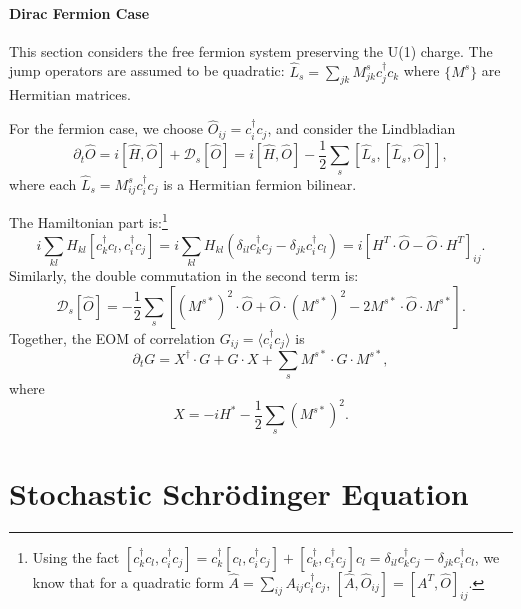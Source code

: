 \documentclass{SciPost}
\begin{document}
\paragraph{Dirac Fermion Case}

This section considers the free fermion system preserving the U(1) charge. The jump operators are assumed to be quadratic: $\hat L_s = \sum_{jk} M^s_{jk} c_j^\dagger c_k$ where $\{M^s\}$ are Hermitian matrices.

For the fermion case, we choose $\hat O_{ij} = c_i^\dagger c_j$, and consider the Lindbladian
\begin{equation}
	\partial_t \hat O = i[\hat H, \hat O] + \mathcal D_s[\hat O]
	= i[\hat H, \hat O] - \frac{1}{2} \sum_s [\hat L_s,[\hat L_s,\hat O]],
\end{equation}
where each $\hat L_s = M^s_{ij} c_i^\dagger c_j$ is a Hermitian fermion bilinear.


The Hamiltonian part is:\footnote{Using the fact
$[c_k^\dagger c_l, c_i^\dagger c_j] = c_k^\dagger[c_l,c_i^\dagger c_j] + [c_k^\dagger,c_i^\dagger c_j]c_l =\delta_{il}c_k^\dagger c_j -\delta_{jk}c_i^\dagger c_l$, we know that for a quadratic form $\hat A = \sum_{ij} A_{ij} c_i^\dagger c_j$, $[\hat A, \hat O_{ij}] = [A^T, \hat O]_{ij}$.}
\begin{equation}
	i \sum_{kl}H_{kl}[c_k^\dagger c_l, c_i^\dagger c_j]
	= i \sum_{kl} H_{kl} (\delta_{il}c_k^\dagger c_j -\delta_{jk}c_i^\dagger c_l) 
	= i [H^T\cdot \hat O - \hat O\cdot H^T]_{ij}.
\end{equation}
Similarly, the double commutation in the second term is:
\begin{equation}
	\mathcal D_s[\hat O]
	= -\frac{1}{2}\sum_s [(M^{s*})^2\cdot\hat O + \hat O\cdot (M^{s*})^2 - 2 M^{s*}\cdot \hat O \cdot M^{s*}].
\end{equation}
Together, the EOM of correlation $G_{ij} = \langle c_i^\dagger c_j\rangle$ is
\begin{equation}
	\partial_t G = X^\dagger \cdot G + G \cdot X + \sum_s M^{s*}\cdot G \cdot M^{s*},
\end{equation}
where 
\begin{equation}
	X = -i H^* - \frac{1}{2}\sum_s (M^{s*})^2.
\end{equation}





\section{Stochastic Schr\"{o}dinger Equation}
\end{document}
